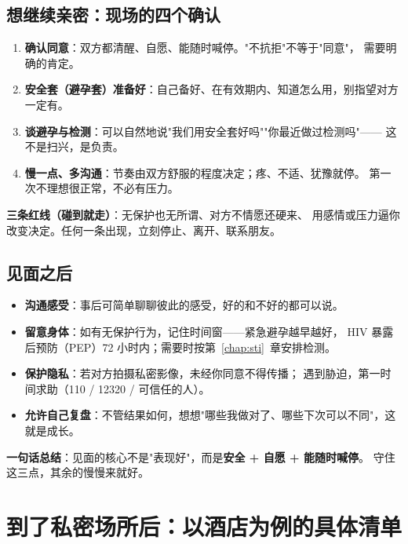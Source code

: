 \documentclass[12pt,UTF8,openany]{ctexbook}
\begin{document}
\section{想继续亲密：现场的四个确认}

\begin{enumerate}[leftmargin=2em,itemsep=0.3em]
  \item \textbf{确认同意}：双方都清醒、自愿、能随时喊停。"不抗拒"不等于"同意"，
        需要明确的肯定。
  \item \textbf{安全套（避孕套）准备好}：自己备好、在有效期内、知道怎么用，别指望对方一定有。
  \item \textbf{谈避孕与检测}：可以自然地说"我们用安全套好吗""你最近做过检测吗"——
        这不是扫兴，是负责。
  \item \textbf{慢一点、多沟通}：节奏由双方舒服的程度决定；疼、不适、犹豫就停。
        第一次不理想很正常，不必有压力。
\end{enumerate}

\noindent\textbf{三条红线（碰到就走）}：无保护也无所谓、对方不情愿还硬来、
用感情或压力逼你改变决定。任何一条出现，立刻停止、离开、联系朋友。

\section{见面之后}

\begin{itemize}[leftmargin=2em]
  \item \textbf{沟通感受}：事后可简单聊聊彼此的感受，好的和不好的都可以说。
  \item \textbf{留意身体}：如有无保护行为，记住时间窗——紧急避孕越早越好，
        HIV 暴露后预防（PEP）72 小时内；需要时按第~\ref{chap:sti}~章安排检测。
  \item \textbf{保护隐私}：若对方拍摄私密影像，未经你同意不得传播；
        遇到胁迫，第一时间求助（110 / 12320 / 可信任的人）。
  \item \textbf{允许自己复盘}：不管结果如何，想想"哪些我做对了、哪些下次可以不同"，这就是成长。
\end{itemize}

\noindent\textbf{一句话总结}：见面的核心不是"表现好"，而是\textbf{安全 + 自愿 + 能随时喊停}。
守住这三点，其余的慢慢来就好。

\chapter{到了私密场所后：以酒店为例的具体清单}
\label{chap:private}
\end{document}
